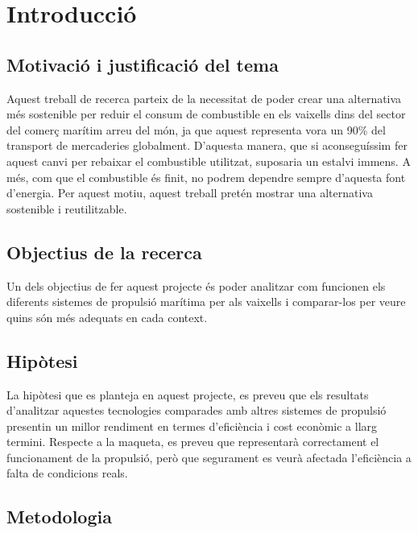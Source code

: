 \chapter*{Introducció}

\section*{Motivació i justificació del tema}
Aquest treball de recerca parteix de la necessitat de poder crear una alternativa més sostenible per reduir el consum de combustible en els vaixells dins del sector del comerç marítim arreu del món, 
ja que aquest representa vora un 90\% del transport de mercaderies globalment. 
D'aquesta manera, que si aconseguíssim fer aquest canvi per rebaixar el combustible utilitzat, suposaria un estalvi immens. 
A més, com que el combustible és finit, no podrem dependre sempre d'aquesta font d'energia. 
Per aquest motiu, aquest treball pretén mostrar una alternativa sostenible i reutilitzable.
\section*{Objectius de la recerca}
Un dels objectius de fer aquest projecte és poder analitzar com funcionen els diferents sistemes de propulsió marítima per als vaixells 
i comparar-los per veure quins són més adequats en cada context.
\section*{Hipòtesi}
La hipòtesi que es planteja en aquest projecte, es preveu que els resultats d'analitzar 
aquestes tecnologies comparades amb altres sistemes de propulsió presentin un millor rendiment
en termes d'eficiència i cost econòmic a llarg termini. 
Respecte a la maqueta, es preveu que representarà correctament el funcionament 
de la propulsió, però que segurament es veurà afectada l'eficiència 
a falta de condicions reals.
\section*{Metodologia}
